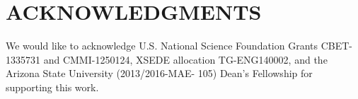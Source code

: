 \documentclass[twocolumn,10pt]{tsfp}
\begin{document}
\section{ACKNOWLEDGMENTS}
We would like to acknowledge U.S. National Science Foundation Grants CBET-1335731 and CMMI-1250124, XSEDE allocation TG-ENG140002, and the Arizona State University (2013/2016-MAE- 105) Dean's Fellowship for supporting this work. 


%
%
%
%
%

\end{document}
